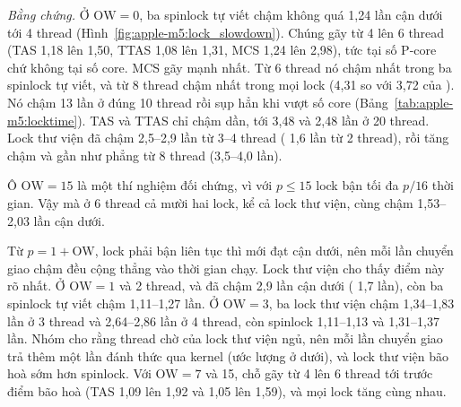 
\emph{Bằng chứng.} Ở $\mathrm{OW} = 0$, ba spinlock tự viết chậm không quá 1,24 lần cận dưới tới 4
thread (Hình~\ref{fig:apple-m5:lock_slowdown}). Chúng gãy từ 4 lên 6 thread (TAS 1,18 lên 1,50, TTAS
1,08 lên 1,31, MCS 1,24 lên 2,98), tức tại số P-core chứ không tại số core. MCS gãy mạnh nhất. Từ 6
thread nó chậm nhất trong ba spinlock tự viết, và từ 8 thread chậm nhất trong mọi lock (4,31 so với 3,72
của ). Nó chậm 13 lần ở đúng 10 thread rồi sụp hẳn khi vượt số core
(Bảng~\ref{tab:apple-m5:locktime}). TAS và TTAS chỉ chậm dần, tới 3,48 và 2,48 lần ở 20 thread. Lock
thư viện đã chậm 2,5--2,9 lần từ 3--4 thread ( 1,6 lần từ 2 thread), rồi tăng
chậm và gần như phẳng từ 8 thread (3,5--4,0 lần).


Ô $\mathrm{OW} = 15$ là một thí nghiệm đối chứng, vì với $p \le 15$ lock bận tối đa $p/16$ thời gian.
Vậy mà ở 6 thread cả mười hai lock, kể cả lock thư viện, cùng chậm 1,53--2,03 lần cận dưới.

Từ $p = 1+\mathrm{OW}$, lock phải bận liên tục thì mới đạt cận dưới, nên mỗi lần chuyển giao chậm
đều cộng thẳng vào thời gian chạy. Lock thư viện cho thấy điểm này rõ nhất. Ở $\mathrm{OW} = 1$ và 2
thread,  và  đã chậm 2,9 lần cận dưới (
1,7 lần), còn ba spinlock tự viết chậm 1,11--1,27 lần. Ở $\mathrm{OW} = 3$, ba lock thư viện chậm
1,34--1,83 lần ở 3 thread và 2,64--2,86 lần ở 4 thread, còn spinlock 1,11--1,13 và 1,31--1,37 lần. Nhóm cho rằng
thread chờ của lock thư viện ngủ, nên mỗi lần chuyển giao trả thêm một lần đánh thức qua kernel (ước
lượng ở dưới), và lock thư viện bão hoà sớm hơn spinlock. Với $\mathrm{OW} = 7$ và 15, chỗ gãy từ 4 lên
6 thread tới trước điểm bão hoà (TAS 1,09 lên 1,92 và 1,05 lên 1,59), và mọi lock tăng cùng nhau.

